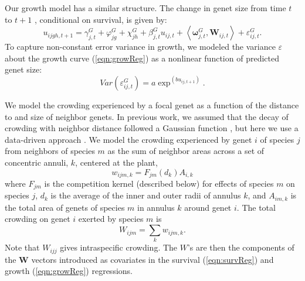 \documentclass[11pt]{article}
\begin{document}
\begin{doublespacing}
Our growth model has a similar structure. The change in genet size from time $t$ to $t+1$ , conditional on survival, is given by:
\begin{equation}
u_{ijgh,t+1} = \gamma_{j,t}^G + \varphi_{jg}^G+  \chi_{jh}^G  + \beta_{j,t}^G u_{ij,t} + 
\left \langle  \boldsymbol{\omega}_{j,t}^G, \boldsymbol{W}_{ij,t} \right \rangle + \varepsilon_{ij,t}^G .
\label{eqn:growReg}
\end{equation}
To capture non-constant error variance in growth, we modeled the variance $\varepsilon$  about the growth curve (\ref{eqn:growReg})  as a nonlinear function of predicted genet size:
\begin{equation}
Var(\varepsilon_{ij,t}^G) = a \exp ^{(bu_{ij,t+1})} .
\label{eqn:growVar}
\end{equation}

We model the crowding experienced by a focal genet as a function of the distance to and size of neighbor genets. In previous work, we assumed that the decay of crowding with neighbor distance followed a Gaussian function \citep{chu_large_2015}, but here we use a data-driven approach \citep{teller_linking_2016}. We model the crowding experienced by genet $i$ of species $j$ from neighbors of species $m$ as the sum of neighbor areas across a set of concentric annuli, $k$, centered at the plant,
\begin{equation}
w_{ijm,k} = F_{jm}(d_{k})A_{i,k}     
\label{eqn:wik}
\end{equation}
where $F_{jm}$ is the competition kernel (described below) for effects of species $m$ on species $j$, 
$d_{k}$ is the average of the inner and outer radii of annulus $k$, 
and $A_{im,k}$ is the total area of genets of species $m$ in annulus $k$ around genet $i$. The total crowding on 
genet $i$ exerted by species $m$ is
\begin{equation}
W_{ijm}  =\sum_k {w_{ijm,k}} .
\label{eqn:wijm}
\end{equation} 
Note that $W_{ijj}$ gives intraspecific crowding. The $W$'s are then the components of the $\boldsymbol{W}$ vectors 
introduced as covariates in the survival (\ref{eqn:survReg}) and growth (\ref{eqn:growReg}) regressions.


\end{doublespacing}
\end{document}
